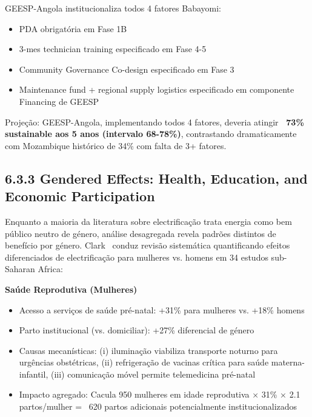 \documentclass[12pt, a4paper]{article}
\begin{document}
GEESP-Angola institucionaliza todos 4 fatores Babayomi:
\begin{itemize}
\item [$\checkmark$] PDA obrigatória em Fase 1B
\item [$\checkmark$] 3-mes technician training especificado em Fase 4-5
\item [$\checkmark$] Community Governance Co-design especificado em Fase 3
\item [$\checkmark$] Maintenance fund + regional supply logistics especificado em componente Financing de GEESP
\end{itemize}

Projeção: GEESP-Angola, implementando todos 4 fatores, deveria atingir \textbf{~73\% sustainable aos 5 anos (intervalo 68-78\%)}, contrastando dramaticamente com Mozambique histórico de 34\% com falta de 3+ fatores.

\subsection*{6.3.3 Gendered Effects: Health, Education, and Economic Participation}

Enquanto a maioria da literatura sobre electrificação trata energia como bem público neutro de género, análise desagregada revela padrões distintos de benefício por género. Clark~\citep{Clark2021} conduz revisão sistemática quantificando efeitos diferenciados de electrificação para mulheres vs. homens em 34 estudos sub-Saharan Africa:

\textbf{Saúde Reprodutiva (Mulheres)}
\begin{itemize}
\item Acesso a serviços de saúde pré-natal: +31\% para mulheres vs. +18\% homens
\item Parto institucional (vs. domiciliar): +27\% diferencial de género
\item Causas mecanísticas: (i) iluminação viabiliza transporte noturno para urgências obstétricas, (ii) refrigeração de vacinas crítica para saúde materna-infantil, (iii) comunicação móvel permite telemedicina pré-natal
\item Impacto agregado: Cacula 950 mulheres em idade reprodutiva × 31\% × 2.1 partos/mulher = ~620 partos adicionais potencialmente institucionalizados
\end{itemize}
\end{document}
